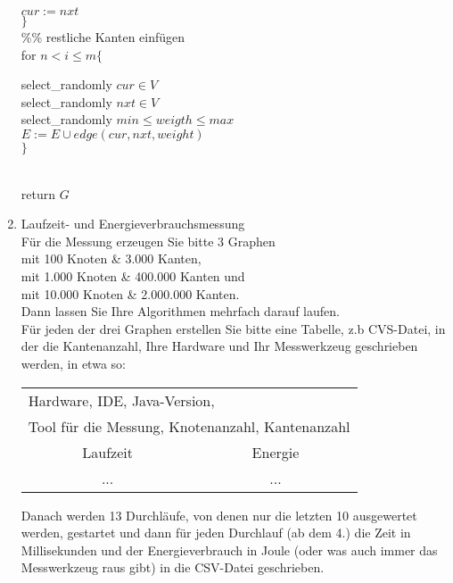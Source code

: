 \documentclass{article}
\begin{document}
\begin{enumerate}
{{{								$cur:=nxt$\\
									$\}$
									}
								\\[2mm]
								\%\%  restliche Kanten einfügen\\[2mm]
								for $ n < i \le m\{$  \\ \hspace*{1cm}
						\parbox{.8\linewidth}{
								select\_randomly $cur\in V$\\
								select\_randomly $nxt\in V$\\
								select\_randomly $min \le weigth \le max$\\ 
								$E:=E \cup edge(cur,nxt, weight)$\\
									$\}$
									}
								\\
						return $G$
				}}				
				
\newpage

       \item Laufzeit- und Energieverbrauchsmessung\\
			    Für die Messung erzeugen Sie bitte  3  Graphen\\ \hspace*{1cm} 
					mit 100 Knoten \& 3.000 Kanten, \\  \hspace*{1cm} 
					mit 1.000 Knoten \& 400.000 Kanten und \\ \hspace*{1cm} 
					mit 10.000  Knoten \& 2.000.000 Kanten.\\
					Dann lassen Sie Ihre Algorithmen mehrfach darauf laufen.\\
					
					Für jeden der drei Graphen erstellen Sie bitte  eine Tabelle, z.b CVS-Datei, 
					in der die Kantenanzahl, Ihre Hardware und Ihr Messwerkzeug geschrieben werden, in etwa so:
					
					\begin{tabular}{|c|c|}
						\hline
						\multicolumn{2}{|l|}{Hardware, IDE, Java-Version, } \\
						\multicolumn{2}{|l|}{ Tool für die Messung, Knotenanzahl, Kantenanzahl} \\ \hline \hline
						Laufzeit & Energie \\ \hline
						 ... &  ...\\ \hline
					\end{tabular}
			
					Danach werden 13 Durchläufe, von denen nur die letzten 10 ausgewertet werden, gestartet und 
					dann für jeden Durchlauf (ab dem 4.) die Zeit in Millisekunden und der Energieverbrauch in Joule 
					(oder was auch immer das Messwerkzeug raus gibt)
					in die  CSV-Datei geschrieben. 
					

\end{enumerate}
\end{document}
